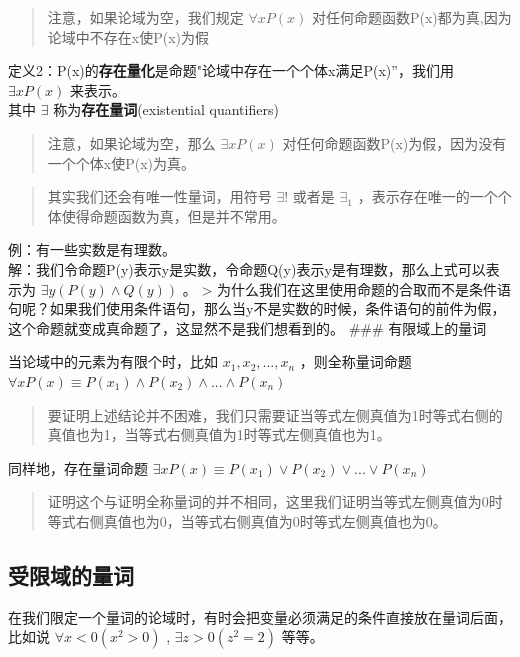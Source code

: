 \documentclass[12pt,a4paper,oneside]{ctexart}
\begin{document}
\begin{quote}
注意，如果论域为空，我们规定 \(\forall xP(x)\) 对任何命题函数P(x)都为真,因为论域中不存在x使P(x)为假
\end{quote}

定义2：P(x)的\textbf{存在量化}是命题"论域中存在一个个体x满足P(x)''，我们用 \(\exists xP(x)\) 来表示。\\
其中 \(\exists\) 称为\textbf{存在量词}(existential quantifiers)

\begin{quote}
注意，如果论域为空，那么 \(\exists xP(x)\) 对任何命题函数P(x)为假，因为没有一个个体x使P(x)为真。
\end{quote}

\begin{quote}
其实我们还会有唯一性量词，用符号 \(\exists !\) 或者是 \(\exists _1\) ，表示存在唯一的一个个体使得命题函数为真，但是并不常用。
\end{quote}

例：有一些实数是有理数。\\
解：我们令命题P(y)表示y是实数，令命题Q(y)表示y是有理数，那么上式可以表示为 \(\exists y(P(y)\wedge Q(y))\) 。 \textgreater{} 为什么我们在这里使用命题的合取而不是条件语句呢？如果我们使用条件语句，那么当y不是实数的时候，条件语句的前件为假，这个命题就变成真命题了，这显然不是我们想看到的。 \#\#\# 有限域上的量词

当论域中的元素为有限个时，比如 \(x_1,x_2,...,x_n\) ，则全称量词命题 \(\forall xP(x)\equiv P(x_1)\wedge P(x_2)\wedge...\wedge P(x_n)\)

\begin{quote}
要证明上述结论并不困难，我们只需要证当等式左侧真值为1时等式右侧的真值也为1，当等式右侧真值为1时等式左侧真值也为1。
\end{quote}

同样地，存在量词命题 \(\exists xP(x)\equiv P(x_1)\vee P(x_2)\vee...\vee P(x_n)\)

\begin{quote}
证明这个与证明全称量词的并不相同，这里我们证明当等式左侧真值为0时等式右侧真值也为0，当等式右侧真值为0时等式左侧真值也为0。
\end{quote}

\subsection*{受限域的量词}

在我们限定一个量词的论域时，有时会把变量必须满足的条件直接放在量词后面，比如说 \(\forall x<0(x^2>0)\) , \(\exists z>0(z^2=2)\) 等等。
\end{document}
